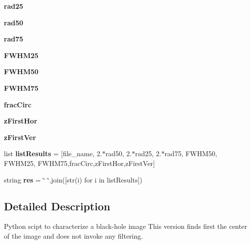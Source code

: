 \begin{DoxyCompactItemize}
{\bfseries rad25}
\item 
\mbox{\label{namespacecharm_a8655e939d936a6038060bdde34180805}} 
{\bfseries rad50}
\item 
\mbox{\label{namespacecharm_a8e9fa04f7279c687f05271736d6e70fe}} 
{\bfseries rad75}
\item 
\mbox{\label{namespacecharm_a69438d054af68ffa0472d36dbe81ac09}} 
{\bfseries F\+W\+H\+M25}
\item 
\mbox{\label{namespacecharm_af8107da40bae0b955292e5511466fd5c}} 
{\bfseries F\+W\+H\+M50}
\item 
\mbox{\label{namespacecharm_ad2133619b884a07f3c5f90c799fa7266}} 
{\bfseries F\+W\+H\+M75}
\item 
\mbox{\label{namespacecharm_aef3542da00326419291c6772efe6998e}} 
{\bfseries frac\+Circ}
\item 
\mbox{\label{namespacecharm_a23c6d9e9ae354f66e17cfec2b85f8dfb}} 
{\bfseries z\+First\+Hor}
\item 
\mbox{\label{namespacecharm_a111efd88a9a0015a8d28f30a5acdef25}} 
{\bfseries z\+First\+Ver}
\item 
\mbox{\label{namespacecharm_a9536fc38328f2f680ec1a025fb0b9d2b}} 
list {\bfseries list\+Results} = \mbox{[}file\+\_\+name, 2.$\ast$rad50, 2.$\ast$rad25, 2.$\ast$rad75, F\+W\+H\+M50, F\+W\+H\+M25, F\+W\+H\+M75,frac\+Circ,z\+First\+Hor,z\+First\+Ver\mbox{]}
\item 
\mbox{\label{namespacecharm_a2ea9f0fea01c343478673df67737695d}} 
string {\bfseries res} = \char`\"{} \char`\"{}.join(\mbox{[}str(i) for i in list\+Results\mbox{]})
\end{DoxyCompactItemize}


\subsection{Detailed Description}
Python scipt to characterize a black-\/hole image This version finds first the center of the image and does not invoke any filtering. 

